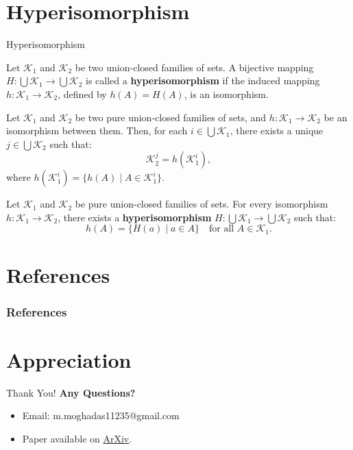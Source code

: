 \documentclass{beamer}
\begin{document}
\section{Hyperisomorphism}
\begin{frame}{Hyperisomorphism}
	\begin{definition}[3.1]
		Let \( \mathcal{K}_1 \) and \( \mathcal{K}_2 \) be two union-closed families of sets. A bijective mapping
		\( H: \bigcup \mathcal{K}_1 \to \bigcup \mathcal{K}_2 \) is called a \textbf{hyperisomorphism} if the induced mapping \( h: \mathcal{K}_1 \to \mathcal{K}_2 \), defined by \( h(A) = H(A) \), is an isomorphism.
	\end{definition}
	\vfill
	\pause
	\begin{lemma}[3.4]
		Let \(\mathcal{K}_1\) and \(\mathcal{K}_2\) be two pure union-closed families of sets, and
		\(h: \mathcal{K}_1 \to \mathcal{K}_2\) be an isomorphism between them. Then, for each \(i \in \bigcup \mathcal{K}_1\), there exists a unique \(j \in \bigcup \mathcal{K}_2\) such that:
		\[
			\mathcal{K}_2^j = h(\mathcal{K}_1^i),
		\]
		where \(h(\mathcal{K}_1^i) = \{h(A) \mid A \in \mathcal{K}_1^i \}\).
	\end{lemma}


\end{frame}

\begin{frame}
	\begin{theorem}[3.1]
		Let \( \mathcal{K}_1 \) and \( \mathcal{K}_2 \) be pure union-closed families of sets. For every isomorphism \( h: \mathcal{K}_1 \to \mathcal{K}_2 \), there exists a \textbf{hyperisomorphism} \( H: \bigcup \mathcal{K}_1 \to \bigcup \mathcal{K}_2 \) such that:
		\[
			h(A) = \{ H(a) \mid a \in A \} \quad \text{for all } A \in \mathcal{K}_1.
		\]
	\end{theorem}
\end{frame}

\section{References}

\begin{frame}
	\frametitle{References}
	\nocite{*} %
	
	
\end{frame}

\section{Appreciation}

\begin{frame}{Thank You!}
	\textbf{Any Questions?}
	\begin{itemize}
		\item Email: m.moghadas11235@gmail.com
		\item Paper available on \href{https://arxiv.org/abs/2501.02637v2}{ArXiv}.
	\end{itemize}
\end{frame}
\end{document}
